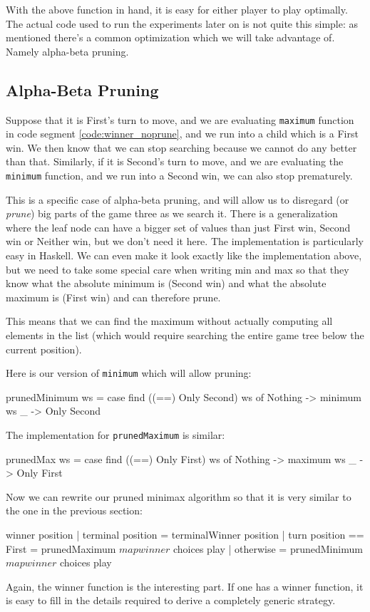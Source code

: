 With the above function in hand, it is easy for either player to play optimally.
The actual code used to run the experiments later on is not quite this simple: as mentioned there's a common optimization which we will take advantage of.
Namely alpha-beta pruning.

\subsection {Alpha-Beta Pruning}
\label{sec:alpha_beta}

Suppose that it is First's turn to move, and we are evaluating \texttt{maximum} function in code segment \ref{code:winner_noprune}, and we run into a child which is a First win.
We then know that we can stop searching because we cannot do any better than that.
Similarly, if it is Second's turn to move, and we are evaluating the \texttt{minimum} function, and we run into a Second win, we can also stop prematurely.

This is a specific case of alpha-beta pruning, and will allow us to disregard (or \emph{prune}) big parts of the game three as we search it.
There is a generalization where the leaf node can have a bigger set of values than just First win, Second win or Neither win, but we don't need it here.
The implementation is particularly easy in Haskell. We can even make it look exactly like the implementation above, but we need to take some special care when writing min and max so that they know what the absolute minimum is (Second win) and what the absolute maximum is (First win) and can therefore prune.

This means that we can find the maximum without actually computing all elements in the list (which would require searching the entire game tree below the current position).

Here is our version of \texttt{minimum} which will allow pruning:
\begin{code}
  prunedMinimum ws = 
    case find ((==) Only Second) ws of
      Nothing -> minimum ws
      _ -> Only Second
\end{code}
The implementation for \texttt{prunedMaximum} is similar:
\begin{code}
  prunedMax ws = 
    case find ((==) Only First) ws of
      Nothing -> maximum ws
      _ -> Only First
\end{code}
Now we can rewrite our pruned minimax algorithm so that it is very similar to the one in the previous section:
\begin{code}
  winner position
    | terminal position       = terminalWinner position
    | turn position == First  = prunedMaximum $ map winner $ choices play
    | otherwise               = prunedMinimum $ map winner $ choices play
\end{code}
Again, the winner function is the interesting part. If one has a winner function, it is easy to fill in the details required to derive a completely generic strategy.

